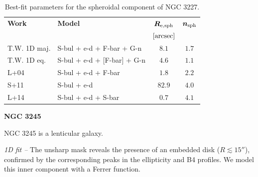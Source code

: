 \documentclass[preprint2]{emulateapj}
\begin{document}
  \begin{table}[h]
  \small
  \caption{Best-fit parameters for the spheroidal component of NGC 3227.}
  \begin{center}
  \begin{tabular}{llcc}
  \hline
  {\bf Work} & {\bf Model}   & $\bm R_{\rm e,sph}$    & $\bm n_{\rm sph}$ \\
    &  &  $[\rm arcsec]$ & \\
  \hline
  T.W. 1D maj. & S-bul + e-d + F-bar + G-n   & $8.1$  &  $1.7$ \\
  T.W. 1D eq.  & S-bul + e-d + [F-bar] + G-n & $4.6$  &  $1.1$ \\
  \hline
  L+04         & S-bul + e-d + F-bar & $1.8$  &  $2.2$ \\
  S+11         & S-bul + e-d	     & $82.9$ &  $4.0$ \\
  L+14         & S-bul + e-d + S-bar & $0.7$  &  $4.1$ \\
  \hline
  \end{tabular}
  \end{center}
  \label{tab:n3227}
  \end{table}

  \clearpage\newpage\noindent
  {\bf NGC 3245 \\}

  NGC 3245 is a lenticular galaxy.


  \emph{1D fit -- }
  The unsharp mask reveals the presence of an embedded disk ($R \lesssim 15''$), 
  confirmed by the corresponding peaks in the ellipticity and B4 profiles.
  We model this inner component with a Ferrer function.
\end{document}
